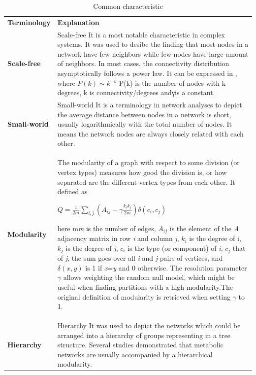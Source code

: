 \documentclass[
]{book}
\begin{document}
\begin{longtable}[]{@{}
  >{\raggedright\arraybackslash}p{}
  >{\raggedright\arraybackslash}p{}@{}}
\caption{Common characteristic}\tabularnewline
\toprule()
\endhead
\textbf{Terminology} & \textbf{Explanation} \\
\textbf{Scale-free} & Scale-free It is a most notable characteristic in complex systems. It was used to desibe the finding that most nodes in a network have few neighbors while few nodes have large amount of neighbors. In most cases, the connectivity distribution asymptotically follows a power law. It can be expressed in , where \(P(k) \sim k^{-y}\) P(k) is the number of nodes with k degrees, k is connectivity/degrees andγis a constant. \\
\textbf{Small-world} & Small-world It is a terminology in network analyses to depict the average distance between nodes in a network is short, usually logarithmically with the total number of nodes. It means the network nodes are always closely related with each other. \\
\textbf{Modularity} & The modularity of a graph with respect to some division (or vertex types) measures how good the division is, or how separated are the different vertex types from each other. It defined as

\(Q=\frac{1}{2m} \sum_{i,j} (A_{ij}-\gamma\frac{k_i k_j}{2m})\delta(c_i,c_j)\)

here m\emph{m} is the number of edges, \(A_{ij}\) is the element of the \emph{A} adjacency matrix in row \emph{i} and column \emph{j}, \(k_i\) is the degree of i, \(k_j\) is the degree of \emph{j}, \(c_i\) is the type (or component) of \emph{i}, \(c_j\) that of \emph{j}, the sum goes over all \emph{i} and \emph{j} pairs of vertices, and \(\delta(x,y)\) is 1 if \emph{x}=\emph{y} and 0 otherwise. The resolution parameter \(\gamma\) allows weighting the random null model, which might be useful when finding partitions with a high modularity.The original definition of modularity is retrieved when setting \(\gamma\) to 1. \\
\textbf{Hierarchy} & Hierarchy It was used to depict the networks which could be arranged into a hierarchy of groups representing in a tree structure. Several studies demonstrated that metabolic networks are usually accompanied by a hierarchical modularity. \\
\bottomrule()
\end{longtable}
\end{document}
